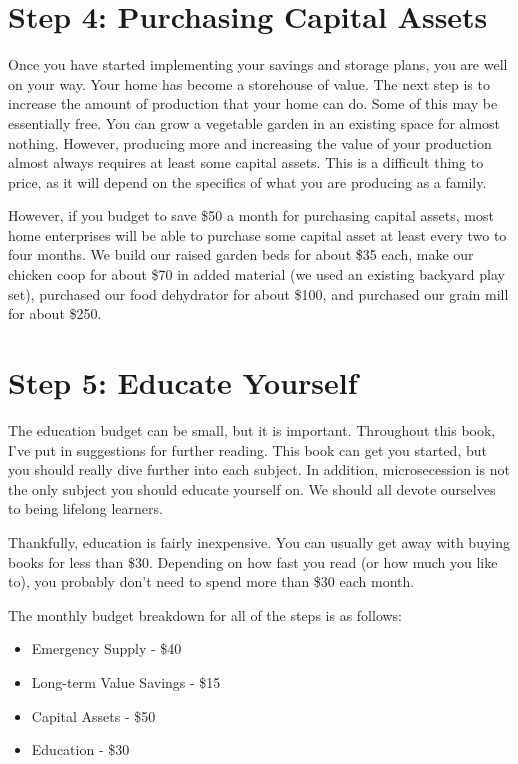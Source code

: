 \section{Step 4: Purchasing Capital Assets}

Once you have started implementing your savings and storage plans, you
are well on your way. Your home has become a storehouse of value. The
next step is to increase the amount of production that your home can
do. Some of this may be essentially free. You can grow a vegetable
garden in an existing space for almost nothing. However, producing more
and increasing the value of your production almost always requires at
least some capital assets. This is a difficult thing to price, as it
will depend on the specifics of what you are producing as a family.

However, if you budget to save \$50 a month for purchasing capital
assets, most home enterprises will be able to purchase some capital
asset at least every two to four months. We build our raised garden
beds for about \$35 each, make our chicken coop for about \$70 in added
material (we used an existing backyard play set), purchased our food
dehydrator for about \$100, and purchased our grain mill for about
\$250. 

\section{Step 5: Educate Yourself}

The education budget can be small, but it is important. Throughout this
book, I've put in suggestions for further reading.
This book can get you started, but you should really dive further into
each subject. In addition, microsecession is not the only subject you
should educate yourself on. We should all devote ourselves to being
lifelong learners.

Thankfully, education is fairly inexpensive. You can usually get away
with buying books for less than \$30. Depending on how fast you read
(or how much you like to), you probably don't need to
spend more than \$30 each month. 

The monthly budget breakdown for all of the steps is as follows:

\begin{itemize}
\item 
Emergency Supply - \$40
\item 
Long-term Value Savings - \$15
\item 
Capital Assets - \$50
\item 
Education - \$30
\end{itemize}

